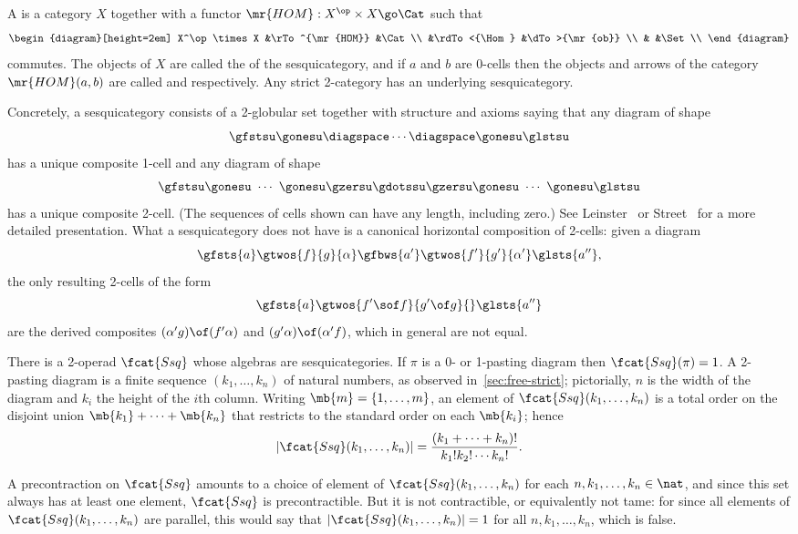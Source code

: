 \begin{example}	
A %
%
%
is a category $X$ together with a functor
$\mr{HOM}: X^\op \times X \go \Cat$ such that
\[
\begin{diagram}[height=2em]
X^\op \times X	&\rTo^{\mr{HOM}}	&\Cat		\\
		&\rdTo<{\Hom}		&\dTo>{\mr{ob}}	\\
		&			&\Set		\\
\end{diagram}
\]
commutes.  The objects of $X$ are called the  of the
sesquicategory, and if $a$ and $b$ are 0-cells then the objects and arrows
of the category $\mr{HOM}(a,b)$ are called  and
 respectively.  Any strict 2-category has an underlying
sesquicategory.

Concretely, a sesquicategory consists of a 2-globular set together with
structure and axioms saying that any diagram of shape
\[
\gfstsu\gonesu
\diagspace 
\cdots
\diagspace 
\gonesu\glstsu
\]
has a unique composite 1-cell and any diagram of shape%
%
%
\[
\gfstsu\gonesu\ \cdots\ \gonesu\gzersu
\gdotssu
\gzersu\gonesu\ \cdots\ \gonesu\glstsu
\]
has a unique composite 2-cell.  (The sequences of cells shown can have any
length, including zero.)  See Leinster~\cite[III.1]{SHDCT} or
Street~\cite[\S 2]{StrCS}%
%
%
for a more detailed presentation.  What a sesquicategory does not have is a
canonical horizontal%
%
%
composition of
2-cells: given a diagram
%
\begin{equation}	\label{diag:ssq-horiz}
\gfsts{a}
\gtwos{f}{g}{\alpha}
\gfbws{a'}
\gtwos{f'}{g'}{\alpha'}
\glsts{a''},
\end{equation}
%
the only resulting 2-cells of the form
\[
\gfsts{a}
\gtwos{f'\sof f}{g'\of g}{}
\glsts{a''}
\]
are the derived composites $(\alpha' g) \of (f' \alpha)$ and $(g' \alpha)
\of (\alpha' f)$, which in general are not equal.

There is a 2-operad $\fcat{Ssq}$ whose algebras are sesquicategories.  If
$\pi$ is a 0- or 1-pasting diagram then $\fcat{Ssq}(\pi) = 1$.  A 2-pasting
diagram is a finite sequence $(k_1, \ldots, k_n)$ of natural numbers, as
observed in~\ref{sec:free-strict}; pictorially, $n$ is the width of the
diagram and $k_i$ the height of the $i$th column.  Writing $\mb{m} = \{ 1,
\ldots, m\}$, an element of $\fcat{Ssq}(k_1, \ldots, k_n)$ is a total order%
%
%
on the disjoint union $\mb{k_1} + \cdots + \mb{k_n}$ that restricts to the
standard order on each $\mb{k_i}$; hence
\[
|\fcat{Ssq}(k_1, \ldots, k_n)|
=
\frac{(k_1 + \cdots + k_n)!}{k_1! k_2! \cdots k_n!}.
\]

A precontraction on $\fcat{Ssq}$ amounts to a choice of element of
$\fcat{Ssq}(k_1, \ldots, k_n)$ for each $n, k_1, \ldots, k_n \in \nat$, and
since this set always has at least one element, $\fcat{Ssq}$ is
precontractible.  But it is not contractible, or equivalently not tame: for
since all elements of $\fcat{Ssq}(k_1, \ldots, k_n)$ are parallel, this
would say that $|\fcat{Ssq}(k_1, \ldots, k_n)| = 1$ for all $n, k_1,
\ldots, k_n$, which is false.
\end{example}

